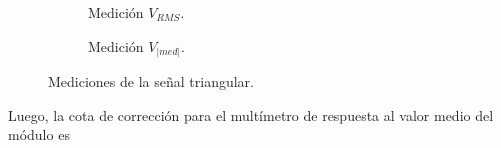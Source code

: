       \begin{figure}[H]
        \centering
        \begin{subfigure}[ht]{0.48\textwidth}
          \caption{Medición $V_{RMS}$.}
          \label{fig:MedicionVrmsTriangular}
        \end{subfigure}
        \hfill 
        \begin{subfigure}[ht]{0.48\textwidth}
          \caption{Medición $V_{|med|}$.}
          \label{fig:MedicionVmedTriangular}
        \end{subfigure}
        \caption{Mediciones de la señal triangular.}
         \label{fig:MedicionSeñalTriangular}
      \end{figure}

      Luego, la cota de corrección para el multímetro de respuesta al 
      valor medio del módulo es

